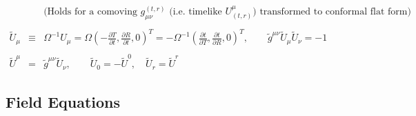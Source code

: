 \documentclass[10pt,letterpaper]{article}
\numberwithin{equation}{section}
\begin{document}
\begin{eqnarray}
\\
&&\text{(Holds for a comoving $g_{\mu\nu}^{(t,r)}$ (i.e. timelike $U^\mu_{(t,r)}$) transformed to conformal flat form)}
\nonumber\\\nonumber\\
\tilde U_\mu &\equiv& \Omega^{-1}U_\mu = \Omega \left(-\frac{\partial T}{\partial t}, \frac{\partial R}{\partial t},0\right)^T
= -\Omega^{-1}\left( \frac{\partial t}{\partial T},\frac{\partial t}{\partial R},0\right)^T,\qquad \tilde g^{\mu\nu}\tilde U_\mu \tilde U_\nu = -1
\\ \nonumber\\
\tilde U^\mu &=& \tilde g^{\mu\nu}\tilde U_\nu,\qquad \tilde U_0 = -\tilde U^0,\quad \tilde U_r =\tilde U^r
\end{eqnarray}
%
\subsection{Field Equations}
\end{document}
